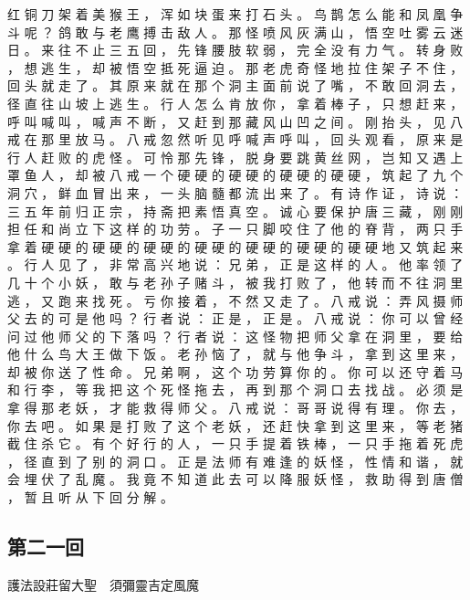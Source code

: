 {红 铜 刀 架 着 美 猴 王 ， 浑 如 块 蛋 来 打 石 头 。
鸟 鹊 怎 么 能 和 凤 凰 争 斗 呢 ？ 鸽 敢 与 老 鹰 搏 击 敌 人 。
那 怪 喷 风 灰 满 山 ， 悟 空 吐 雾 云 迷 日 。
来 往 不 止 三 五 回 ， 先 锋 腰 肢 软 弱 ， 完 全 没 有 力 气 。
转 身 败 ， 想 逃 生 ， 却 被 悟 空 抵 死 逼 迫 。
那 老 虎 奇 怪 地 拉 住 架 子 不 住 ， 回 头 就 走 了 。
其 原 来 就 在 那 个 洞 主 面 前 说 了 嘴 ， 不 敢 回 洞 去 ， 径 直 往 山 坡 上 逃 生 。
行 人 怎 么 肯 放 你 ， 拿 着 棒 子 ， 只 想 赶 来 ， 呼 叫 喊 叫 ， 喊 声 不 断 ， 又 赶 到 那 藏 风 山 凹 之 间 。
刚 抬 头 ， 见 八 戒 在 那 里 放 马 。
八 戒 忽 然 听 见 呼 喊 声 呼 叫 ， 回 头 观 看 ， 原 来 是 行 人 赶 败 的 虎 怪 。
可 怜 那 先 锋 ， 脱 身 要 跳 黄 丝 网 ， 岂 知 又 遇 上 罩 鱼 人 ， 却 被 八 戒 一 个 硬 硬 的 硬 硬 的 硬 硬 的 硬 硬 ， 筑 起 了 九 个 洞 穴 ， 鲜 血 冒 出 来 ， 一 头 脑 髓 都 流 出 来 了 。
有 诗 作 证 ， 诗 说 ： 三 五 年 前 归 正 宗 ， 持 斋 把 素 悟 真 空 。
诚 心 要 保 护 唐 三 藏 ， 刚 刚 担 任 和 尚 立 下 这 样 的 功 劳 。
子 一 只 脚 咬 住 了 他 的 脊 背 ， 两 只 手 拿 着 硬 硬 的 硬 硬 的 硬 硬 的 硬 硬 的 硬 硬 的 硬 硬 的 硬 硬 地 又 筑 起 来 。
行 人 见 了 ， 非 常 高 兴 地 说 ： 兄 弟 ， 正 是 这 样 的 人 。
他 率 领 了 几 十 个 小 妖 ， 敢 与 老 孙 子 赌 斗 ， 被 我 打 败 了 ， 他 转 而 不 往 洞 里 逃 ， 又 跑 来 找 死 。
亏 你 接 着 ， 不 然 又 走 了 。
八 戒 说 ： 弄 风 摄 师 父 去 的 可 是 他 吗 ？ 行 者 说 ： 正 是 ， 正 是 。
八 戒 说 ： 你 可 以 曾 经 问 过 他 师 父 的 下 落 吗 ？ 行 者 说 ： 这 怪 物 把 师 父 拿 在 洞 里 ， 要 给 他 什 么 鸟 大 王 做 下 饭 。
老 孙 恼 了 ， 就 与 他 争 斗 ， 拿 到 这 里 来 ， 却 被 你 送 了 性 命 。
兄 弟 啊 ， 这 个 功 劳 算 你 的 。
你 可 以 还 守 着 马 和 行 李 ， 等 我 把 这 个 死 怪 拖 去 ， 再 到 那 个 洞 口 去 找 战 。
必 须 是 拿 得 那 老 妖 ， 才 能 救 得 师 父 。
八 戒 说 ： 哥 哥 说 得 有 理 。
你 去 ， 你 去 吧 。
如 果 是 打 败 了 这 个 老 妖 ， 还 赶 快 拿 到 这 里 来 ， 等 老 猪 截 住 杀 它 。
有 个 好 行 的 人 ， 一 只 手 提 着 铁 棒 ， 一 只 手 拖 着 死 虎 ， 径 直 到 了 别 的 洞 口 。
正 是 法 师 有 难 逢 的 妖 怪 ， 性 情 和 谐 ， 就 会 埋 伏 了 乱 魔 。
我 竟 不 知 道 此 去 可 以 降 服 妖 怪 ， 救 助 得 到 唐 僧 ， 暂 且 听 从 下 回 分 解 。
}\switchcolumn\flushpage  \begin{pinyinscope}{\myfontt \section{第二一回}     護法設莊留大聖　須彌靈吉定風魔

}
\end{pinyinscope}
